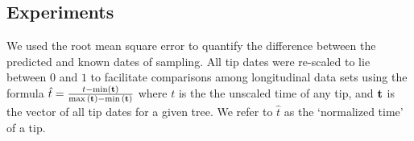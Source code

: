 \documentclass[12pt]{article}
\begin{document}
\subsection * {Experiments} \label{subsec:experiments}
We used the root mean square error to quantify the difference between the predicted and known dates of sampling.
All tip dates were re-scaled to lie between $0$ and $1$ to facilitate comparisons among longitudinal data sets using the formula $ \hat{t} = \frac{t - \min(\bf{t}) }{ \max{(\bf{t})} - \min{(\bf{t}})}$ where $t$ is the the unscaled time of any tip, and $\bf{t}$ is the vector of all tip dates for a given tree. 
We refer to $\hat{t}$ as the `normalized time' of a tip. 

%
%
%
\end{document}
